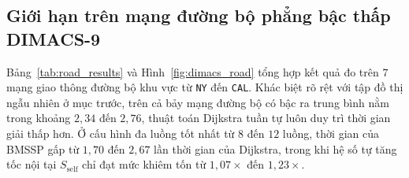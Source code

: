 \subsection{Giới hạn trên mạng đường bộ phẳng bậc thấp DIMACS-9}\label{subsec:c3-road}

Bảng~\ref{tab:road_results} và Hình~\ref{fig:dimacs_road} tổng hợp kết quả đo trên $7$ mạng giao thông đường bộ khu vực từ \texttt{NY} đến \texttt{CAL}. Khác biệt rõ rệt với tập đồ thị ngẫu nhiên ở mục trước, trên cả bảy mạng đường bộ có bậc ra trung bình nằm trong khoảng $2{,}34$ đến $2{,}76$, thuật toán Dijkstra tuần tự luôn duy trì thời gian giải thấp hơn. Ở cấu hình đa luồng tốt nhất từ $8$ đến $12$ luồng, thời gian của BMSSP gấp từ $1{,}70$ đến $2{,}67$ lần thời gian của Dijkstra, trong khi hệ số tự tăng tốc nội tại $S_{\mathrm{self}}$ chỉ đạt mức khiêm tốn từ $1{,}07\times$ đến $1{,}23\times$.

\begin{table}[!htb]
\centering
{}
\caption{Thời gian giải trung vị tính bằng ms và tỷ số tốc độ trên 7 mạng đường bộ Hoa Kỳ thuộc bộ chuẩn DIMACS-9.}
\label{tab:road_results}
\end{table}

